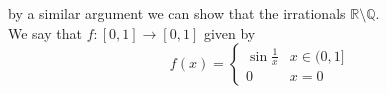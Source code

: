 \documentclass[12pt]{article}
\newcommand{\R}{\mathbb R}
\newcommand{\Q}{\mathbb Q}
\begin{document}
by a similar argument we can show that the irrationals $\R\setminus\Q$. \\

We say that $f:[0,1]\to[0,1]$ given by
\begin{equation*}
	f(x) = 
	\begin{cases}
		\sin \frac{1}{x} & x \in (0, 1] \\
		0 & x = 0
	\end{cases}
\end{equation*}
\end{document}
